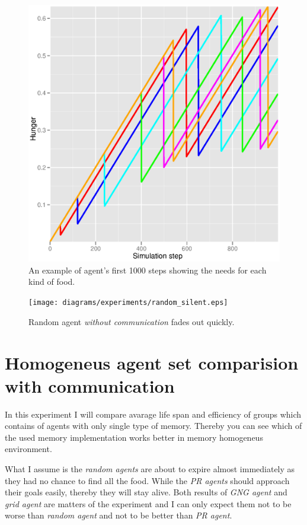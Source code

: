 \begin{figure}[h!]
  \centering                                
  \includegraphics[scale=0.4]{diagrams/experiments/single_agent.eps}    
  \caption{An example of agent's first 1000 steps showing the needs for each kind of food.}
  \label{experiments:singleagent}
\end{figure}

\begin{figure}[h!]
  \centering                                
  \texttt{[image: diagrams/experiments/random\_silent.eps]}    
  \caption{Random agent \emph{without communication} fades out quickly.}
  \label{experiments:random-silent}
\end{figure} 

\section{Homogeneus agent set comparision with communication}

In this experiment I will compare avarage life span and efficiency of groups which contains of agents with only single type of memory. Thereby you can see which of the used memory implementation works better in memory homogeneus environment.

What I assume is the \emph{random agents} are about to expire almost immediately as they had no chance to find all the food. While the \emph{PR agents} should approach their goals easily, thereby they will stay alive. Both results of \emph{GNG agent} and \emph{grid agent} are matters of the experiment and I can only expect them not to be worse than \emph{random agent} and not to be better than \emph{PR agent}.     

